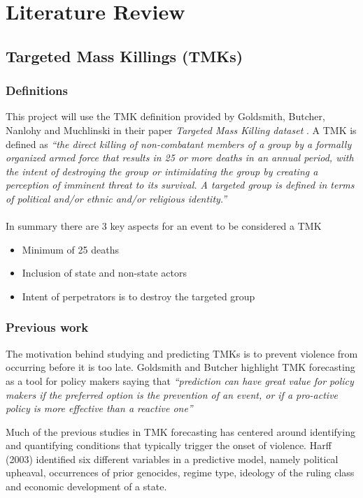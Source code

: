 \chapter{Literature Review}\label{ch:background}


\section{Targeted Mass Killings (TMKs)}
\subsection{Definitions}
This project will use the TMK definition provided by Goldsmith, Butcher, Nanlohy and Muchlinski in their paper  \emph{Targeted Mass Killing dataset} \cite{Goldsmith2013}. A TMK is defined as \emph{“the direct killing of non-combatant members of a
group by a formally organized armed force that results in 25 or more deaths in an annual period,
with the intent of destroying the group or intimidating the group by creating a perception of
imminent threat to its survival. A targeted group is defined in terms of political and/or ethnic and/or
religious identity.”} \\\\
In summary there are 3 key aspects for an event to be considered a TMK
\begin{itemize}
  \item Minimum of 25 deaths
  \item Inclusion of state and non-state actors
  \item Intent of perpetrators is to destroy the targeted group
\end{itemize}

\subsection{Previous work}
The motivation behind studying and predicting TMKs is to prevent violence from occurring before it is too late. Goldsmith and Butcher highlight TMK forecasting as a tool for policy makers saying that \emph{“prediction can have great value for policy makers if the preferred option is
the prevention of an event, or if a pro-active policy is more effective than a reactive one”} \cite{Goldsmith2018}

Much of the previous studies in TMK forecasting has centered around identifying and quantifying conditions that typically trigger the onset of violence. Harff (2003) \cite{Harff2003} identified six different variables in a predictive model, namely political upheaval, occurrences of prior genocides, regime type, ideology of the ruling class and economic development of a state. 

